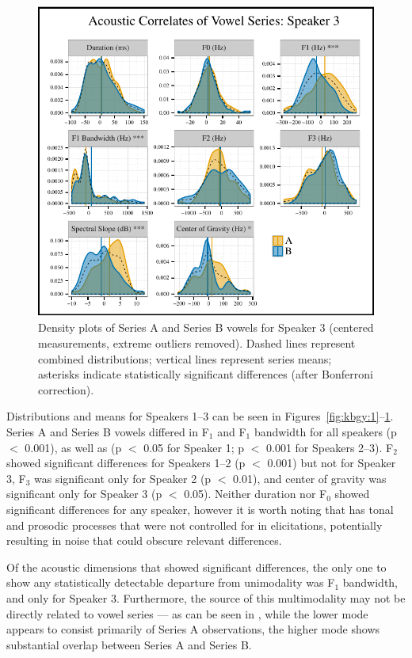 \documentclass[output=paper
,newtxmath
,modfonts
,nonflat]{langsci/langscibook}
\begin{document}
\begin{figure}[p]
\includegraphics[scale=1]{figures/s3-correlates.pdf}
\caption{Density plots of Series A and Series B vowels for Speaker 3 (centered measurements, extreme outliers removed).  Dashed lines represent combined distributions; vertical lines represent series means; asterisks indicate statistically significant differences (after Bonferroni correction).}
\label{fig:kbgy:3}
\end{figure}

Distributions and means for Speakers 1--3 can be seen in Figures~\ref{fig:kbgy:1}--\ref{fig:kbgy:3}.  Series A and Series B vowels differed in F$_1$ and F$_1$ bandwidth for all speakers (p $<$ 0.001), as well as  (p $<$ 0.05 for Speaker 1; p $<$ 0.001 for Speakers 2--3). F$_2$ showed significant differences for Speakers 1--2 (p $<$ 0.001) but not for Speaker 3, F$_3$ was significant only for Speaker 2 (p $<$ 0.01), and center of gravity was significant only for Speaker 3 (p $<$ 0.05).  Neither duration nor F$_0$ showed significant differences for any speaker, however it is worth noting that  has tonal and prosodic processes \citep{Greenetal2015} that were not controlled for in elicitations, potentially resulting in noise that could obscure relevant differences.

Of the acoustic dimensions that showed significant differences, the only one to show any statistically detectable departure from unimodality was F$_1$ bandwidth, and only for Speaker 3.  Furthermore, the source of this multimodality may not be directly related to vowel series --- as can be seen in , while the lower mode appears to consist primarily of Series A observations, the higher mode shows substantial overlap between Series A and Series B.
\end{document}
